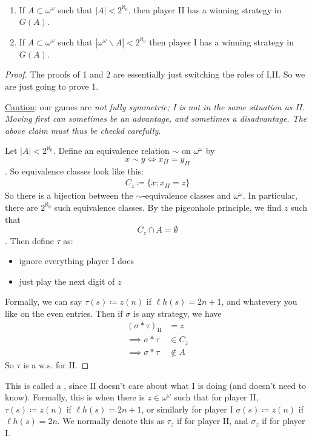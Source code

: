 \documentclass[]{article}
\newcommand{\II}{\textrm{II}}
\newcommand{\om}{\omega}
\newcommand{\lh}{\ell h}
\begin{document}
\begin{theorem*}\ \\
    \begin{enumerate}
        \item If $A\subset \om^\om$ such that $|A| < 2^{\aleph_0}$, then player II has a winning strategy in $G(A)$.
        \item If $A\subset \om^\om$ such that $|\om^\om\backslash A| < 2^{\aleph_0}$ then player I has a winning strategy in $G(A)$.
    \end{enumerate}
\end{theorem*}
\begin{proof}
    The proofs of 1 and 2 are essentially just switching the roles of I,II. So we are just going to prove 1.

    \underline{Caution}: our games are \it{not} fully symmetric; I is not in the same situation as II. Moving first can sometimes be an advantage, and sometimes a disadvantage. The above claim must thus be checkd carefully.

    Let $|A| < 2^{\aleph_0}$. Define an equivalence relation $\sim$ on $\om^\om$ by $$x\sim y \iff x_{II} = y_{II}$$. So equivalence classes look like this:
    \begin{align*}
        C_z \coloneqq \{x; x_{II} = z\}
    \end{align*}
    So there is a bijection between the $\sim$-equivalence classes and $\om^\om$. In particular, there are $2^{\aleph_0}$ such equivalence classes. By the pigeonhole principle, we find $z$ such that $$C_z \cap A = \emptyset$$. Then define $\tau$ as:
    \begin{itemize}
        \item ignore everything player I does
        \item just play the next digit of $z$
    \end{itemize}
    Formally, we can say $\tau(s)\coloneqq z(n)$ if $\lh(s) = 2n+1$, and whatevery you like on the even entries. Then if $\sigma$ is any strategy, we have
    \begin{align*}
        (\sigma\ast\tau)_{\II} &= z\\
        \implies \sigma\ast\tau &\in C_z\\
        \implies \sigma\ast\tau&\not\in A
    \end{align*}
    So $\tau$ is a w.s. for II.
\end{proof}

This is called a , since II doesn't care about what I is doing (and doesn't need to know). Formally, this is when there is $z\in \om^\om$ such that for player II, $\tau(s)\coloneqq z(n)$ if $\lh(s) = 2n+1$, or similarly for player I $\sigma(s)\coloneqq z(n)$ if $\lh(s) = 2n$. We normally denote this as $\tau_z$ if for player II, and $\sigma_z$ if for player I.
\end{document}
